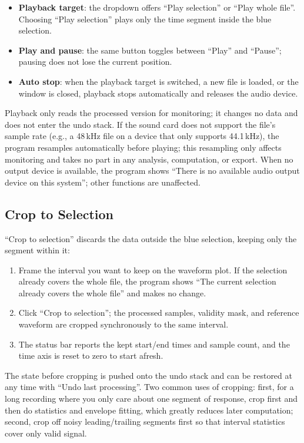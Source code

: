 \documentclass[UTF8,a4paper,12pt]{ctexart}
\begin{document}
\begin{itemize}
  \item \textbf{Playback target}: the dropdown offers ``Play selection'' or ``Play whole file''. Choosing ``Play selection'' plays only the time segment inside the blue selection.
  \item \textbf{Play and pause}: the same button toggles between ``Play'' and ``Pause''; pausing does not lose the current position.
  \item \textbf{Auto stop}: when the playback target is switched, a new file is loaded, or the window is closed, playback stops automatically and releases the audio device.
\end{itemize}

Playback only reads the processed version for monitoring; it changes no data and does not enter the undo stack. If the sound card does not support the file's sample rate (e.g., a 48\,kHz file on a device that only supports 44.1\,kHz), the program resamples automatically before playing; this resampling only affects monitoring and takes no part in any analysis, computation, or export. When no output device is available, the program shows ``There is no available audio output device on this system''; other functions are unaffected.

\subsection{Crop to Selection}

``Crop to selection'' discards the data outside the blue selection, keeping only the segment within it:

\begin{enumerate}
  \item Frame the interval you want to keep on the waveform plot. If the selection already covers the whole file, the program shows ``The current selection already covers the whole file'' and makes no change.
  \item Click ``Crop to selection''; the processed samples, validity mask, and reference waveform are cropped synchronously to the same interval.
  \item The status bar reports the kept start/end times and sample count, and the time axis is reset to zero to start afresh.
\end{enumerate}

The state before cropping is pushed onto the undo stack and can be restored at any time with ``Undo last processing''. Two common uses of cropping: first, for a long recording where you only care about one segment of response, crop first and then do statistics and envelope fitting, which greatly reduces later computation; second, crop off noisy leading/trailing segments first so that interval statistics cover only valid signal.
\end{document}
